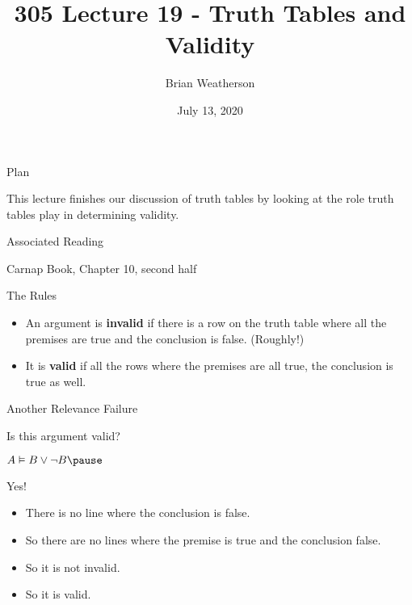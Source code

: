 \documentclass[
  ignorenonframetext,
]{beamer}
\title{305 Lecture 19 - Truth Tables and Validity}
\author{Brian Weatherson}
\date{July 13, 2020}
\providecommand{\tightlist}{%
  \setlength{\itemsep}{0pt}\setlength{\parskip}{0pt}}
\renewcommand{\,}{\text{, }}
\renewenvironment*{quote}	
	{\list{}{\rightmargin   \leftmargin} \item } 	
	{\endlist }
\begin{document}
\frame{\titlepage}

\begin{frame}{Plan}
\protect\hypertarget{plan}{}

This lecture finishes our discussion of truth tables by looking at the
role truth tables play in determining validity.

\end{frame}

\begin{frame}{Associated Reading}
\protect\hypertarget{associated-reading}{}

Carnap Book, Chapter 10, second half

\end{frame}

\begin{frame}{The Rules}
\protect\hypertarget{the-rules}{}

\begin{itemize}
\tightlist
\item
  An argument is \textbf{invalid} if there is a row on the truth table
  where all the premises are true and the conclusion is false.
  (Roughly!)
\item
  It is \textbf{valid} if all the rows where the premises are all true,
  the conclusion is true as well.
\end{itemize}

\end{frame}

\begin{frame}{Another Relevance Failure}
\protect\hypertarget{another-relevance-failure}{}

Is this argument valid?

\begin{quote}
\(A \vDash B \vee \neg B \pause\)
\end{quote}

Yes!

\begin{itemize}
\tightlist
\item
  There is no line where the conclusion is false.
\item
  So there are no lines where the premise is true and the conclusion
  false.
\item
  So it is not invalid.
\item
  So it is valid.
\end{itemize}

\end{frame}
\end{document}
